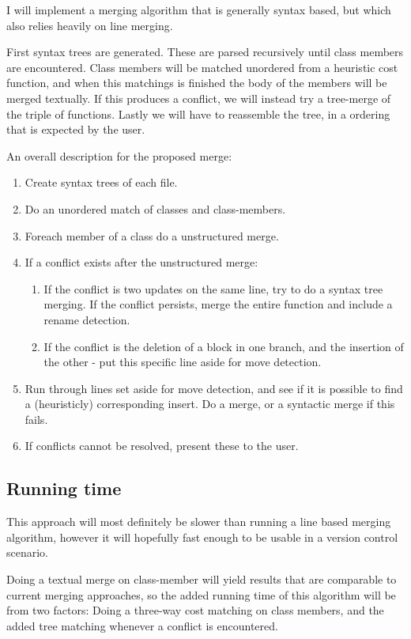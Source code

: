\documentclass[11pt]{article}
\begin{document}
I will implement a merging algorithm that is generally syntax based, but which also relies heavily on line merging.

First syntax trees are generated. These are parsed recursively until class members are encountered. Class members will be matched unordered from a heuristic cost function, and when this matchings is finished the body of the members will be merged textually. If this produces a conflict, we will instead try a tree-merge of the triple of functions.  Lastly we will have to reassemble the tree, in a ordering that is expected by the user. 

An overall description for the proposed merge:

\begin{enumerate}
    \item Create syntax trees of each file.
    \item Do an unordered match of classes and class-members.
    \item Foreach member of a class do a unstructured merge.
    \item If a conflict exists after the unstructured merge:
    \begin{enumerate}
        \item If the conflict is two updates on the same line, try to do a syntax tree merging. If the conflict persists, merge the entire function and include a rename detection.
        \item If the conflict is the deletion of a block in one branch, and the insertion of the other - put this specific line aside for move detection.
    \end{enumerate}
    \item Run through lines set aside for move detection, and see if it is possible to find a (heuristicly) corresponding insert. Do a merge, or a syntactic merge if this fails.
    \item If conflicts cannot be resolved, present these to the user.
\end{enumerate}

\subsection{Running time}
This approach will most definitely be slower than running a line based merging algorithm, however it will hopefully fast enough to be usable in a version control scenario.

Doing a textual merge on class-member will yield results that are comparable to current merging approaches, so the added running time of this algorithm will be from two factors: Doing a three-way cost matching on class members, and the added tree matching whenever a conflict is encountered.
\end{document}
